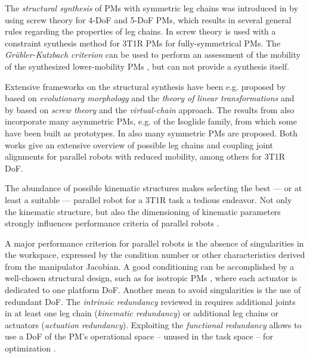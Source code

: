\documentclass[
	graybox,
	vecphys] %
	{svmult}
\begin{document}
The \emph{structural synthesis} of PMs with symmetric leg chains was introduced in  \cite{FangTsa2002} by using screw theory for 4-DoF and 5-DoF PMs, which results in several general rules regarding the properties of leg chains.
In \cite{HuangLi2003} screw theory is used with a constraint synthesis method for 3T1R PMs for fully-symmetrical PMs.
The \emph{Grübler-Kutzbach criterion} can be used to perform an assessment of the mobility of the synthesized lower-mobility PMs \cite{HuangLi2003,Gogu2008}, but can not provide a synthesis itself.

Extensive frameworks on the structural synthesis have been e.g. proposed by 
\cite{Gogu2008} based on \emph{evolutionary morphology} and the \emph{theory of linear transformations} and by \cite{KongGos2007} based on \emph{screw theory} and the \emph{virtual-chain} approach.
%
The results from \cite{Gogu2008} also incorporate many asymmetric PMs, e.g. of the Isoglide family, from which some have been built as prototypes.
In \cite{KongGos2007} also many symmetric PMs are proposed.
Both works give an extensive overview of possible leg chains and coupling joint alignments for parallel robots with reduced mobility, among others for 3T1R DoF.

The abundance of possible kinematic structures makes selecting the best --- or at least a suitable --- parallel robot for a 3T1R task a tedious endeavor.
Not only the kinematic structure, but also the dimensioning of kinematic parameters strongly influences performance criteria of parallel robots \cite{Merlet2006}.

A major performance criterion for parallel robots is the absence of singularities in the workspace, expressed by the condition number or other characteristics derived from the manipulator Jacobian.
A good conditioning can be accomplished by a well-chosen structural design, such as for isotropic PMs \cite{Carricato2005,Gogu2008}, where each actuator is dedicated to one platform DoF.
Another mean to avoid singularities is the use of redundant DoF.
The \emph{intrinsic redundancy} reviewed in \cite{GosselinSch2018} requires additional joints in at least one leg chain (\emph{kinematic redundancy}) or additional leg chains or actuators (\emph{actuation redundancy}).
Exploiting the \emph{functional redundancy} allows to use a DoF of the PM's operational space -- unused in the task space -- for optimization \cite{CorinaldiAngCal2016}.
\end{document}
